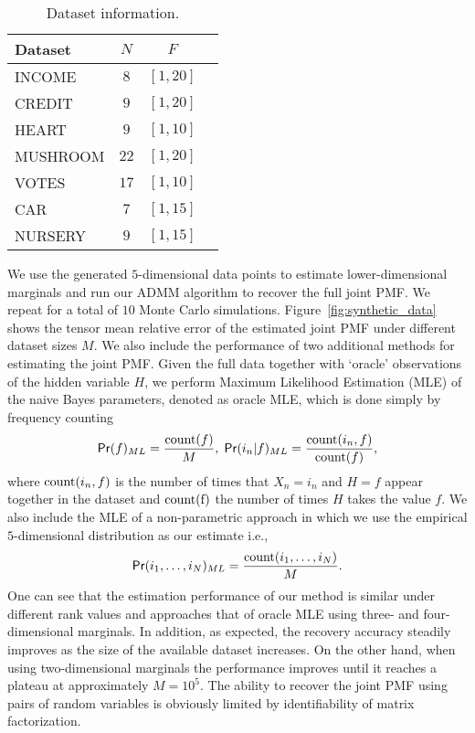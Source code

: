 \documentclass[journal]{IEEEtran}
\begin{document}
\begin{table}[!ht]
\begin{center}
\caption{Dataset information.}
\label{table:sparse_factors}
\begin{tabular}{l c c  c}
\hline
 Dataset    &  $ N $  & $F$  \\
\hline
 INCOME       & $8$ & $[1,20]$ \\
\hline
CREDIT     &  $9$ & $[1,20]$ \\
\hline
HEART      & $9$ & $[1,10]$ \\
\hline
MUSHROOM   &     $22$  & $[1,20]$ \\
\hline
VOTES      &  $17$  & $[1,10]$ \\
\hline
CAR        &  $7$  & $[1,15]$ \\
\hline
NURSERY     & $9$ &  $[1,15]$\\
\hline
\end{tabular}
\end{center}
\end{table}
We use the generated $5$-dimensional data points to estimate  {lower-dimensional} marginals and run our ADMM algorithm to recover the full joint PMF. We repeat for a total of $10$ Monte Carlo simulations. Figure~\ref{fig:synthetic_data} shows the tensor mean relative error of the estimated joint PMF under different dataset sizes $M$. We also include the performance of two additional methods for estimating the joint PMF. Given the full data together with `oracle' observations of the hidden variable $H$, we perform Maximum Likelihood Estimation (MLE) of the naive Bayes parameters, denoted as oracle MLE, which is done simply by frequency counting
\[
{\sf Pr}(f)_{ML} = \frac{{\rm count}(f)}{M}, \; {\sf Pr}(i_n| f)_{ML} = \frac{{\rm count}(i_n,f)}{{\rm count}(f)}, 
\]
where ${\rm count}(i_n,f)$ is the number of times that $X_n = i_n$ and $H = f$ appear together in the dataset and $ \rm count(f)$ the number of times $H$ takes the value $f$. We also include the MLE of a non-parametric approach in which we use the empirical $5$-dimensional distribution as our estimate i.e.,
\[
{\sf Pr}(i_1,\ldots,i_N)_{ML} = \frac{{\rm count}(i_1,\ldots,i_N)}{M}. \]
One can see that the estimation performance of our method is similar under different rank values and approaches that of oracle MLE using  {three- and four-dimensional} marginals. In addition, as expected, the recovery accuracy steadily improves as the size of the available dataset increases. On the other hand, when using  {two-dimensional} marginals the performance improves until it reaches a plateau at approximately $M = 10^5$. The ability to recover the joint PMF using pairs of random variables is obviously limited by identifiability of matrix factorization.
\end{document}
